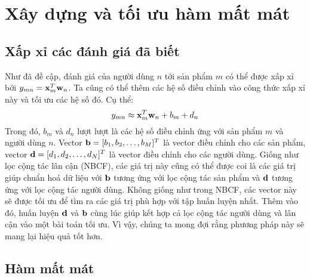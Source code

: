 \section{Xây dựng và tối ưu hàm mất mát}
\label{sec:2_2}
\subsection{Xấp xỉ các đánh giá đã biết}
Như đã đề cập, đánh giá của người dùng $n$ tới sản phẩm $m$ có thể được xấp xỉ
bởi $y_{mn} = \mathbf{x}^T_m\mathbf{w}_n$. Ta cũng có thể thêm các hệ số điều chỉnh vào công thức xấp xỉ
này và tối ưu các hệ số đó. Cụ thể:
\begin{equation}
y_{mn} \approx \mathbf{x}_m^T \mathbf{w}_n + b_m + d_n
\end{equation}
Trong đó, $b_m$ và $d_n$ lượt lượt là các hệ số điều chỉnh ứng với sản phẩm
$m$ và người dùng $n$. Vector $\mathbf{b} = [b_1, b_2, \dots, b_M]^T$ là vector điều chỉnh
cho các sản phẩm, vector $\mathbf{d} = [d_1, d_2, \dots, d_N]^T$ là vector điều chỉnh cho các
người dùng. Giống như lọc cộng tác lân cận (NBCF),
các giá trị này cũng có thể được coi là các giá trị giúp chuẩn hoá dữ liệu với
$\mathbf{b}$ tương ứng với lọc cộng tác sản phẩm và $\mathbf{d}$ tương ứng với lọc cộng tác người dùng. Không
giống như trong NBCF, các vector này sẽ được tối ưu để tìm ra các giá trị phù hợp với tập huấn luyện nhất. Thêm vào đó, huấn luyện $\mathbf{d}$ và
$\mathbf{b}$ cùng lúc giúp kết hợp cả lọc cộng tác người dùng và lân cận vào một bài toán tối
ưu. Vì vậy, chúng ta mong đợi rằng phương pháp này sẽ mang lại hiệu quả tốt hơn.


\subsection{Hàm mất mát }


